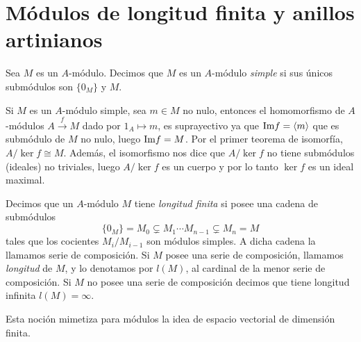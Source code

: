 \documentclass[../main.tex]{subfiles}
\begin{document}
\section{Módulos de longitud finita y anillos artinianos}
\begin{definition}
Sea $M$ es un $A$-módulo. Decimos que $M$ es un $A$-módulo \textit{simple} si sus únicos submódulos son $\{0_M\}$ y $M.$
\end{definition}

\begin{remark}
Si $M$ es un $A$-módulo simple, sea $m\in M$ no nulo, entonces el homomorfismo de $A$-módulos $A\overset{f}{\rightarrow} M$ dado por $1_A\mapsto m$, es suprayectivo ya que $\text{Im} f = \langle m \rangle$ que es submódulo de $M$ no nulo, luego $\text{Im} f = M$. Por el primer teorema de isomorfía,  $A/\ker{f}\cong M$. Además, el isomorfismo nos dice que $A/\ker f$ no tiene submódulos (ideales) no triviales, luego $A/\ker f$ es un cuerpo y por lo tanto $\ker f$ es un ideal maximal.
\end{remark}

\begin{definition}
Decimos que un $A$-módulo $M$ tiene \textit{longitud finita} si posee una cadena de submódulos
$$\{0_M\}=M_0\subsetneq M_1\cdots M_{n-1}\subsetneq M_n=M$$
tales que los cocientes $M_i/M_{i-1}$ son módulos simples. A dicha cadena la llamamos serie de composición. Si $M$ posee una serie de composición, llamamos \textit{longitud} de $M$, y lo denotamos por $l(M)$, al cardinal de la menor serie de composición. Si $M$ no posee una serie de composición decimos que tiene longitud infinita $l(M)=\infty.$
\end{definition}

Esta noción mimetiza para módulos la idea de espacio vectorial de dimensión finita.
\end{document}
